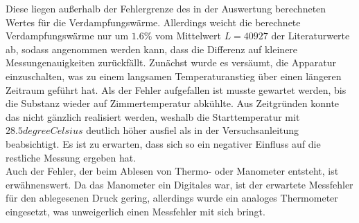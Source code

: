 Diese liegen außerhalb der Fehlergrenze des in der Auswertung berechneten Wertes für die 
Verdampfungswärme. Allerdings weicht die berechnete Verdampfungswärme nur um $1.6 \%$ vom 
Mittelwert $L= 40927$ der Literaturwerte
ab, sodass angenommen werden kann, dass die Differenz auf kleinere Messungenauigkeiten zurückfällt.
Zunächst wurde es versäumt, die Apparatur einzuschalten, was zu einem langsamen Temperaturanstieg über einen längeren Zeitraum geführt hat. Als der Fehler aufgefallen
ist musste gewartet werden, bis die Substanz wieder auf Zimmertemperatur abkühlte. Aus Zeitgründen konnte das nicht gänzlich realisiert werden, weshalb die Starttemperatur 
mit $ 28.5 \si{degreeCelsius}$ deutlich höher ausfiel als in der Versuchsanleitung beabsichtigt. Es ist zu erwarten, dass sich so ein negativer Einfluss auf die restliche Messung
ergeben hat. \\
Auch der Fehler, der beim Ablesen von Thermo- oder Manometer entsteht, ist erwähnenswert. Da das Manometer ein Digitales war, ist der erwartete Messfehler für den ablegesenen 
Druck gering, allerdings wurde ein analoges Thermometer eingesetzt, was unweigerlich einen Messfehler mit sich bringt.

